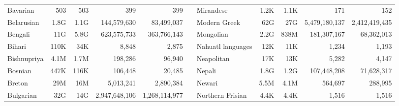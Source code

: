 \begin{table*}[t!]
{\begin{tabular}{@{}lrrrrclrrrr@{}}
            Bavarian                  & 503                      & 503                       & 399                      & 399                       &                          & Mirandese                 & 1.2K                     & 1.1K                      & 171                      & 152                       \\
            Belarusian                & 1.8G                     & 1.1G                      & 144,579,630              & 83,499,037                &                          & Modern Greek              & 62G                      & 27G                       & 5,479,180,137            & 2,412,419,435             \\
            Bengali                   & 11G                      & 5.8G                      & 623,575,733              & 363,766,143               &                          & Mongolian                 & 2.2G                     & 838M                      & 181,307,167              & 68,362,013                \\
            Bihari                    & 110K                     & 34K                       & 8,848                    & 2,875                     &                          & Nahuatl languages         & 12K                      & 11K                       & 1,234                    & 1,193                     \\
            Bishnupriya               & 4.1M                     & 1.7M                      & 198,286                  & 96,940                    &                          & Neapolitan                & 17K                      & 13K                       & 5,282                    & 4,147                     \\
            Bosnian                   & 447K                     & 116K                      & 106,448                  & 20,485                    &                          & Nepali                    & 1.8G                     & 1.2G                      & 107,448,208              & 71,628,317                \\
            Breton                    & 29M                      & 16M                       & 5,013,241                & 2,890,384                 &                          & Newari                    & 5.5M                     & 4.1M                      & 564,697                  & 288,995                   \\
            Bulgarian                 & 32G                      & 14G                       & 2,947,648,106            & 1,268,114,977             &                          & Northern Frisian          & 4.4K                     & 4.4K                      & 1,516                    & 1,516                     \\

\end{tabular}}
\end{table*}
